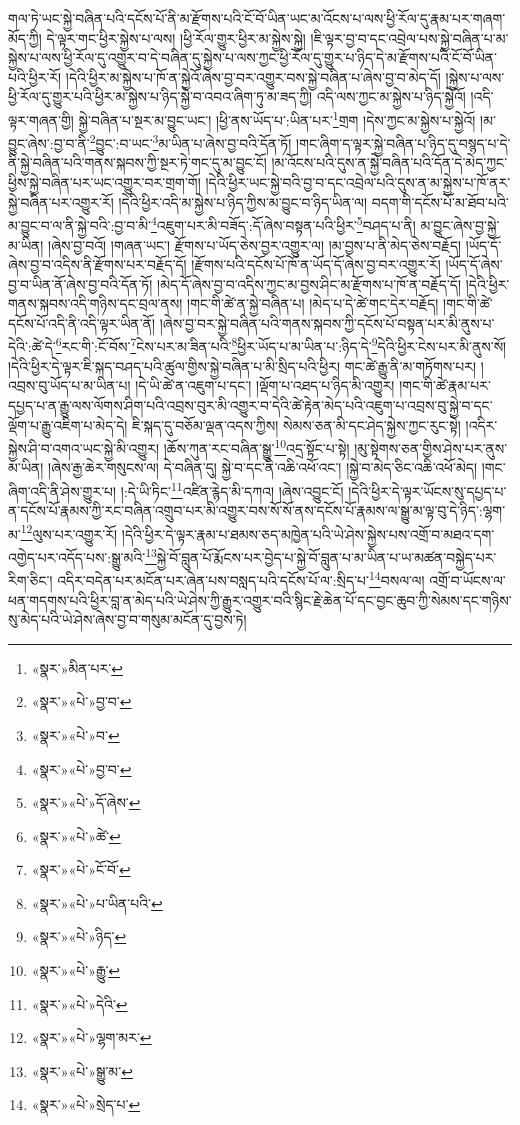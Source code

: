 གལ་ཏེ་ཡང་སྐྱེ་བཞིན་པའི་དངོས་པོ་ནི་མ་རྫོགས་པའི་ངོ་བོ་ཡིན་ཡང་མ་འོངས་པ་ལས་ཕྱི་རོལ་དུ་རྣམ་པར་གཞག་མོད་ཀྱི། དེ་ལྟར་གང་ཕྱིར་སྐྱེས་པ་ལས། །ཕྱི་རོལ་གྱུར་ཕྱིར་མ་སྐྱེས་སྐྱེ། །ཇི་ལྟར་བྱ་བ་དང་འབྲེལ་པས་སྐྱེ་བཞིན་པ་མ་སྐྱེས་པ་ལས་ཕྱི་རོལ་དུ་འགྱུར་བ་དེ་བཞིན་དུ་སྐྱེས་པ་ལས་ཀྱང་ཕྱི་རོལ་དུ་གྱུར་པ་ཉིད་དེ་མ་རྫོགས་པའི་ངོ་བོ་ཡིན་པའི་ཕྱིར་རོ། །དེའི་ཕྱིར་མ་སྐྱེས་པ་ཁོ་ན་སྐྱེའོ་ཞེས་བྱ་བར་འགྱུར་བས་སྐྱེ་བཞིན་པ་ཞེས་བྱ་བ་མེད་དོ། །སྐྱེས་པ་ལས་ཕྱི་རོལ་དུ་གྱུར་པའི་ཕྱིར་མ་སྐྱེས་པ་ཉིད་སྐྱེ་བ་འབའ་ཞིག་ཏུ་མ་ཟད་ཀྱི། འདི་ལས་ཀྱང་མ་སྐྱེས་པ་ཉིད་སྐྱེའོ། །འདི་ལྟར་གཞན་གྱི། སྐྱེ་བཞིན་པ་སྔར་མ་བྱུང་ཡང་། །ཕྱི་ནས་ཡོད་པ་:ཡིན་པར་\footnote{«སྣར་»མིན་པར་}གྲག །དེས་ཀྱང་མ་སྐྱེས་པ་སྐྱེའོ། །མ་བྱུང་ཞེས་:བྱ་བ་ནི་\footnote{«སྣར་»«པེ་»བྱ་བ་}བྱུང་:བ་ཡང་\footnote{«སྣར་»«པེ་»བ་}མ་ཡིན་པ་ཞེས་བྱ་བའི་དོན་ཏོ། །གང་ཞིག་ད་ལྟར་སྐྱེ་བཞིན་པ་ཉིད་དུ་བསྙད་པ་དེ་ནི་སྐྱེ་བཞིན་པའི་གནས་སྐབས་ཀྱི་སྔར་ཏེ་གང་དུ་མ་བྱུང་ངོ། །མ་འོངས་པའི་དུས་ན་སྐྱེ་བཞིན་པའི་དོན་དེ་མེད་ཀྱང་ཕྱིས་སྐྱེ་བཞིན་པར་ཡང་འགྱུར་བར་གྲག་གོ། །དེའི་ཕྱིར་ཡང་སྐྱེ་བའི་བྱ་བ་དང་འབྲེལ་པའི་དུས་ན་མ་སྐྱེས་པ་ཁོ་ནར་སྐྱེ་བཞིན་པར་འགྱུར་རོ། །དེའི་ཕྱིར་འདི་མ་སྐྱེས་པ་ཉིད་ཀྱིས་མ་བྱུང་བ་ཉིད་ཡིན་ལ། བདག་གི་དངོས་པོ་མ་ཐོབ་པའི་མ་བྱུང་བ་ལ་ནི་སྐྱེ་བའི་:བྱ་བ་མི་\footnote{«སྣར་»«པེ་»བྱ་བ་}འཇུག་པར་མི་བཟོད་:དོ་ཞེས་བསྟན་པའི་ཕྱིར་\footnote{«སྣར་»«པེ་»དོ་ཞེས་}བཤད་པ་ནི། མ་བྱུང་ཞེས་བྱ་སྐྱེ་མ་ཡིན། །ཞེས་བྱ་བའོ། །གཞན་ཡང་། རྫོགས་པ་ཡོད་ཅེས་བྱར་འགྱུར་ལ། །མ་བྱས་པ་ནི་མེད་ཅེས་བརྗོད། །ཡོད་དོ་ཞེས་བྱ་བ་འདིས་ནི་རྫོགས་པར་བརྗོད་དོ། །རྫོགས་པའི་དངོས་པོ་ཁོ་ན་ཡོད་དོ་ཞེས་བྱ་བར་འགྱུར་རོ། །ཡོད་དོ་ཞེས་བྱ་བ་ཡིན་ནོ་ཞེས་བྱ་བའི་དོན་ཏོ། །མེད་དོ་ཞེས་བྱ་བ་འདིས་ཀྱང་མ་བྱས་ཤིང་མ་རྫོགས་པ་ཁོ་ན་བརྗོད་དོ། །དེའི་ཕྱིར་གནས་སྐབས་འདི་གཉིས་དང་བྲལ་ནས། །གང་གི་ཚེ་ན་སྐྱེ་བཞིན་པ། །མེད་པ་དེ་ཚེ་གང་དེར་བརྗོད། །གང་གི་ཚེ་དངོས་པོ་འདི་ནི་འདི་ལྟར་ཡིན་ནོ། །ཞེས་བྱ་བར་སྐྱེ་བཞིན་པའི་གནས་སྐབས་ཀྱི་དངོས་པོ་བསྟན་པར་མི་ནུས་པ་དེའི་:ཚེ་དེ་\footnote{«སྣར་»«པེ་»ཚེ་}རང་གི་:ངོ་བོས་\footnote{«སྣར་»«པེ་»ངོ་བོ་}ངེས་པར་མ་ཟིན་པའི་\footnote{«སྣར་»«པེ་»པ་ཡིན་པའི་}ཕྱིར་ཡོད་པ་མ་ཡིན་པ་:ཉིད་དེ་\footnote{«སྣར་»«པེ་»ཉིད་}དེའི་ཕྱིར་ངེས་པར་མི་ནུས་སོ། །དེའི་ཕྱིར་དེ་ལྟར་ཇི་སྐད་བཤད་པའི་ཚུལ་གྱིས་སྐྱེ་བཞིན་པ་མི་སྲིད་པའི་ཕྱིར། གང་ཚེ་རྒྱུ་ནི་མ་གཏོགས་པར། །འབྲས་བུ་ཡོད་པ་མ་ཡིན་པ། །དེ་ཡི་ཚེ་ན་འཇུག་པ་དང་། །ལྡོག་པ་འཐད་པ་ཉིད་མི་འགྱུར། །གང་གི་ཚེ་རྣམ་པར་དཔྱད་པ་ན་རྒྱུ་ལས་ལོགས་ཤིག་པའི་འབྲས་བུར་མི་འགྱུར་བ་དེའི་ཚེ་རྟེན་མེད་པའི་འཇུག་པ་འབྲས་བུ་སྐྱེ་བ་དང་ལྡོག་པ་རྒྱུ་འཇིག་པ་མེད་དེ། ཇི་སྐད་དུ་བཅོམ་ལྡན་འདས་ཀྱིས། སེམས་ཅན་མི་དང་ཤེད་སྐྱེས་ཀྱང་རུང་སྟེ། །འདིར་སྐྱེས་ཤི་བ་འགའ་ཡང་སྐྱེ་མི་འགྱུར། །ཆོས་ཀུན་རང་བཞིན་སྒྱུ་\footnote{«སྣར་»«པེ་»རྒྱུ་}འདྲ་སྟོང་པ་སྟེ། །མུ་སྟེགས་ཅན་གྱིས་ཤེས་པར་ནུས་མ་ཡིན། །ཞེས་རྒྱ་ཆེར་གསུངས་ལ། དེ་བཞིན་དུ། སྐྱེ་བ་དང་ནི་འཆི་འཕོ་འང་། །སྐྱེ་བ་མེད་ཅིང་འཆི་འཕོ་མེད། །གང་ཞིག་འདི་ནི་ཤེས་གྱུར་པ། །:དེ་ཡི་ཏིང་\footnote{«སྣར་»«པེ་»དེའི་}འཛིན་རྙེད་མི་དཀའ། །ཞེས་འབྱུང་ངོ། །དེའི་ཕྱིར་དེ་ལྟར་ཡོངས་སུ་དཔྱད་པ་ན་དངོས་པོ་རྣམས་ཀྱི་རང་བཞིན་འགྲུབ་པར་མི་འགྱུར་བས་སོ་སོ་ནས་དངོས་པོ་རྣམས་ལ་སྒྱུ་མ་ལྟ་བུ་དེ་ཉིད་:ལྷག་མ་\footnote{«སྣར་»«པེ་»ལྷག་མར་}ལུས་པར་འགྱུར་རོ། །དེའི་ཕྱིར་དེ་ལྟར་རྣམ་པ་ཐམས་ཅད་མཁྱེན་པའི་ཡེ་ཤེས་སྐྱེས་པས་འགྲོ་བ་མཐའ་དག་འགྱེད་པར་འདོད་པས་:སྒྱུ་མའི་\footnote{«སྣར་»«པེ་»སྒྱུ་མ་}སྐྱེ་བོ་བླུན་པོ་རྨོངས་པར་བྱེད་པ་སྐྱེ་བོ་བླུན་པ་མ་ཡིན་པ་ཡ་མཚན་བསྐྱེད་པར་རིག་ཅིང་། འདིར་བདེན་པར་མངོན་པར་ཞེན་པས་བསླད་པའི་དངོས་པོ་ལ་:སྲིད་པ་\footnote{«སྣར་»«པེ་»སྲེད་པ་}བསལ་ལ། འགྲོ་བ་ཡོངས་ལ་ཕན་གདགས་པའི་ཕྱིར་བླ་ན་མེད་པའི་ཡེ་ཤེས་ཀྱི་རྒྱུར་འགྱུར་བའི་སྙིང་རྗེ་ཆེན་པོ་དང་བྱང་ཆུབ་ཀྱི་སེམས་དང་གཉིས་སུ་མེད་པའི་ཡེ་ཤེས་ཞེས་བྱ་བ་གསུམ་མངོན་དུ་བྱས་ཏེ། 